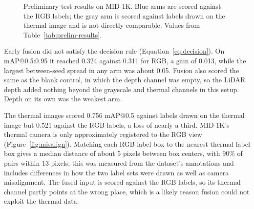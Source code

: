 \begin{figure}[htbp]
\centering
{}
\caption[Preliminary test results on MID-1K]{Preliminary test results on MID-1K. Blue arms are scored against the RGB
labels; the gray arm is scored against labels drawn on the thermal image and is
not directly comparable. Values from Table~\ref{tab:prelim-results}.}
\label{fig:prelim-chart}
\end{figure}

Early fusion did not satisfy the decision rule (Equation~\ref{eq:decision}). On mAP@0.5:0.95 it reached 0.324
against 0.311 for RGB, a gain of 0.013, while the largest between-seed spread in
any arm was about 0.05. Fusion also scored the same as the blank control, in
which the depth channel was empty, so the LiDAR depth added nothing beyond the
grayscale and thermal channels in this setup. Depth on its own was the weakest
arm.

The thermal images scored 0.756 mAP@0.5 against labels drawn on the thermal
image but 0.521 against the RGB labels, a loss of nearly a third. MID-1K's
thermal camera is only approximately registered to the RGB view (Figure~\ref{fig:misalign}). Matching each
RGB label box to the nearest thermal label box gives a median distance of about
5 pixels between box centers, with 90\% of pairs within 13 pixels; this was
measured from the dataset's annotations and includes differences in how the two
label sets were drawn as well as camera misalignment. The fused input is scored
against the RGB labels, so its thermal channel partly points at the wrong place,
which is a likely reason fusion could not exploit the thermal data.



